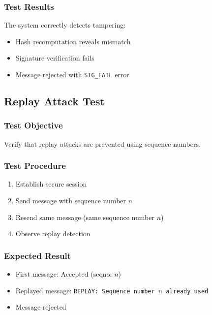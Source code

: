 \documentclass[runningheads]{llncs}
\begin{document}
\subsubsection{Test Results}

The system correctly detects tampering:
\begin{itemize}
    \item Hash recomputation reveals mismatch
    \item Signature verification fails
    \item Message rejected with \texttt{SIG\_FAIL} error
\end{itemize}

\subsection{Replay Attack Test}

\subsubsection{Test Objective}

Verify that replay attacks are prevented using sequence numbers.

\subsubsection{Test Procedure}

\begin{enumerate}
    \item Establish secure session
    \item Send message with sequence number $n$
    \item Resend same message (same sequence number $n$)
    \item Observe replay detection
\end{enumerate}

\subsubsection{Expected Result}

\begin{itemize}
    \item First message: Accepted (seqno: $n$)
    \item Replayed message: \texttt{REPLAY: Sequence number $n$ already used}
    \item Message rejected
\end{itemize}
\end{document}
